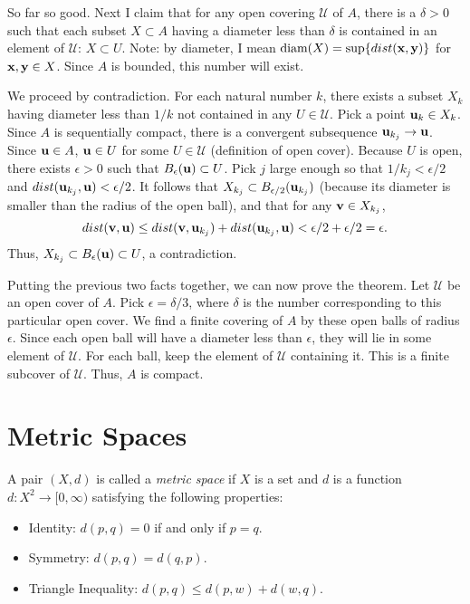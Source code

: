 \documentclass[letterpaper, twoside, 12pt]{book}
\begin{document}
\begin{solution}
    So far so good. Next I claim that for any open covering \(\mathcal U\) of
    \(A\), there is a \(\delta > 0\) such that each subset \(X \subset A\)
    having a diameter less than \(\delta\) is contained in an element 
    of \(\mathcal U\): \(X \subset U\). Note: by diameter,
    I mean \(\text{diam}(X) = \text{sup}\{dist(\mathbf x, \mathbf y)\}\) 
    for \(\mathbf x, \mathbf y \in X\). Since \(A\) is bounded, this number will
    exist.
    
    We proceed by contradiction. For each natural number \(k\), there exists
    a subset \(X_{k}\) having diameter less than \(1/k\) not contained in 
    any \(U \in \mathcal U\). Pick a point \(\mathbf u_k \in X_k\). Since \(A\)
    is sequentially compact, there is a convergent subsequence 
    \(\mathbf u_{k_j} \to \mathbf u\). Since \(\mathbf u \in A\), \(\mathbf u \in U\)
    for some \(U \in \mathcal U\) (definition of open cover). Because \(U\) is open, 
    there exists \(\epsilon > 0\) such that \(B_{\epsilon}(\mathbf u) \subset U\). 
    Pick \(j\) large enough so that \(1 / k_j < \epsilon / 2\) and 
    \(dist(\mathbf u_{k_j}, \mathbf u) < \epsilon/2 \). It follows that
    \(X_{k_{j}} \subset B_{\epsilon/2}(\mathbf u_{k_j})\) (because its diameter
    is smaller than the radius of the open ball), and that for any \(\mathbf v \in X_{k_j}\),
    \[ dist(\mathbf v, \mathbf u) \leq dist(\mathbf v, \mathbf u_{k_j}) + dist(\mathbf u_{k_j}, \mathbf u)
    < \epsilon /2 + \epsilon / 2 = \epsilon .\]
    Thus, \(X_{k_{j}} \subset B_{\epsilon}(\mathbf u) \subset U\), a contradiction.

    Putting the previous two facts together, we can now prove the theorem. Let
    \(\mathcal U\) be an open cover of \(A\). Pick \(\epsilon = \delta / 3\), where
    \(\delta\) is the number corresponding to this particular open cover. We 
    find a finite covering of \(A\) by these open balls of radius \(\epsilon\). Since
    each open ball will have a diameter less than \(\epsilon\), they will lie
    in some element of \(\mathcal U\). For each ball, keep the element of \(\mathcal U\)
    containing it. This is a finite subcover of \(\mathcal U\). Thus, \(A\) is compact.

\end{solution}

\chapter{Metric Spaces}

\begin{definition}
  A pair \((X,d)\) is called a \textit{metric space} if \(X\) is a set
  and \(d\) is a function \(d:X^2\to[0,\infty)\) satisfying the following
  properties:
  \begin{itemize}
    \item Identity: \(d(p,q)=0\) if and only if \(p=q\).
    \item Symmetry: \(d(p,q)=d(q,p)\).
    \item Triangle Inequality: \(d(p,q)\leq d(p,w)+d(w,q)\).
  \end{itemize}
\end{definition}
\end{document}
